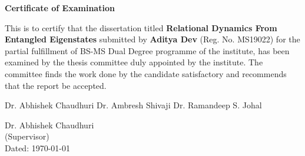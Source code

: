 \begin{center}
    \textbf{\Large Certificate of Examination}
\end{center}

This is to certify that the dissertation titled \textbf{Relational Dynamics From Entangled Eigenstates} submitted by 
\textbf{Aditya Dev} (Reg. No. MS19022) for the partial fulfillment of BS-MS Dual Degree 
programme of the institute, has been examined by the thesis committee duly appointed by the 
institute. The committee finds the work done by the candidate satisfactory and recommends 
that the report be accepted.

\vspace{4cm}

Dr. Abhishek Chaudhuri \hspace{0.9cm} Dr. Ambresh Shivaji \hspace{0.9cm} Dr. Ramandeep S. Johal

\vspace{4cm}

\begin{flushright}
    Dr. Abhishek Chaudhuri
    \\
    (Supervisor)
    \\
    \vspace{4cm}
    Dated: \today
\end{flushright}